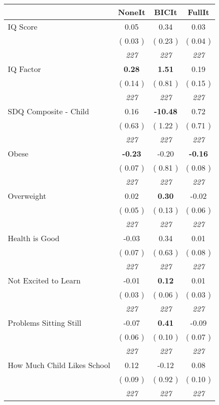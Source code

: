 \begin{tabular}{l c c c}
\toprule
 & NoneIt & BICIt & FullIt \\
\midrule
IQ Score &      0.05 &      0.34 &      0.03 \\
& (     0.03 ) & (     0.23 ) & (     0.04 ) \\
& \textit{ 227 } & \textit{ 227 } & \textit{ 227 } \\
IQ Factor & \textbf{      0.28 } & \textbf{      1.51 } &      0.19 \\
& (     0.14 ) & (     0.81 ) & (     0.15 ) \\
& \textit{ 227 } & \textit{ 227 } & \textit{ 227 } \\
SDQ Composite - Child &      0.16 & \textbf{    -10.48 } &      0.72 \\
& (     0.63 ) & (     1.22 ) & (     0.71 ) \\
& \textit{ 227 } & \textit{ 227 } & \textit{ 227 } \\
Obese & \textbf{     -0.23 } &     -0.20 & \textbf{     -0.16 } \\
& (     0.07 ) & (     0.81 ) & (     0.08 ) \\
& \textit{ 227 } & \textit{ 227 } & \textit{ 227 } \\
Overweight &      0.02 & \textbf{      0.30 } &     -0.02 \\
& (     0.05 ) & (     0.13 ) & (     0.06 ) \\
& \textit{ 227 } & \textit{ 227 } & \textit{ 227 } \\
Health is Good &     -0.03 &      0.34 &      0.01 \\
& (     0.07 ) & (     0.63 ) & (     0.08 ) \\
& \textit{ 227 } & \textit{ 227 } & \textit{ 227 } \\
Not Excited to Learn &     -0.01 & \textbf{      0.12 } &      0.01 \\
& (     0.03 ) & (     0.06 ) & (     0.03 ) \\
& \textit{ 227 } & \textit{ 227 } & \textit{ 227 } \\
Problems Sitting Still &     -0.07 & \textbf{      0.41 } &     -0.09 \\
& (     0.06 ) & (     0.10 ) & (     0.07 ) \\
& \textit{ 227 } & \textit{ 227 } & \textit{ 227 } \\
How Much Child Likes School &      0.12 &     -0.12 &      0.08 \\
& (     0.09 ) & (     0.92 ) & (     0.10 ) \\
& \textit{ 227 } & \textit{ 227 } & \textit{ 227 } \\
\bottomrule
\end{tabular}
